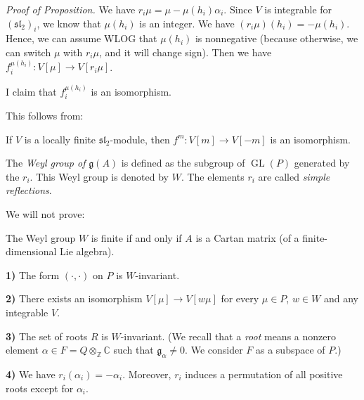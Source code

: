 \documentclass[etingof-lie.tex]{subfiles}
\begin{document}
\textit{Proof of Proposition.} We have $r_{i}\mu=\mu-\mu\left(  h_{i}\right)
\alpha_{i}$. Since $V$ is integrable for $\left(  \mathfrak{sl}_{2}\right)
_{i}$, we know that $\mu\left(  h_{i}\right)  $ is an integer. We have
$\left(  r_{i}\mu\right)  \left(  h_{i}\right)  =-\mu\left(  h_{i}\right)  $.
Hence, we can assume WLOG that $\mu\left(  h_{i}\right)  $ is nonnegative
(because otherwise, we can switch $\mu$ with $r_{i}\mu$, and it will change
sign). Then we have $f_{i}^{\mu\left(  h_{i}\right)  }:V\left[  \mu\right]
\rightarrow V\left[  r_{i}\mu\right]  $.

I claim that $f_{i}^{\mu\left(  h_{i}\right)  }$ is an isomorphism.

This follows from:

\begin{lemma}
If $V$ is a locally finite $\mathfrak{sl}_{2}$-module, then $f^{m}:V\left[
m\right]  \rightarrow V\left[  -m\right]  $ is an isomorphism.
\end{lemma}

\begin{definition}
The \textit{Weyl group of} $\mathfrak{g}\left(  A\right)  $ is defined as the
subgroup of $\operatorname*{GL}\left(  P\right)  $ generated by the $r_{i}$.
This Weyl group is denoted by $W$. The elements $r_{i}$ are called
\textit{simple reflections}.
\end{definition}

We will not prove:

\begin{remark}
The Weyl group $W$ is finite if and only if $A$ is a Cartan matrix (of a
finite-dimensional Lie algebra).
\end{remark}

\begin{proposition}
\label{prop.weylkac.prop0}\textbf{1)} The form $\left(  \cdot,\cdot\right)  $
on $P$ is $W$-invariant.

\textbf{2)} There exists an isomorphism $V\left[  \mu\right]  \rightarrow
V\left[  w\mu\right]  $ for every $\mu\in P$, $w\in W$ and any integrable $V$.

\textbf{3)} The set of roots $R$ is $W$-invariant. (We recall that a
\textit{root} means a nonzero element $\alpha\in F=Q\otimes_{\mathbb{Z}%
}\mathbb{C}$ such that $\mathfrak{g}_{\alpha}\neq0$. We consider $F$ as a
subspace of $P$.)

\textbf{4)} We have $r_{i}\left(  \alpha_{i}\right)  =-\alpha_{i}$. Moreover,
$r_{i}$ induces a permutation of all positive roots except for $\alpha_{i}$.
\end{proposition}
\end{document}

